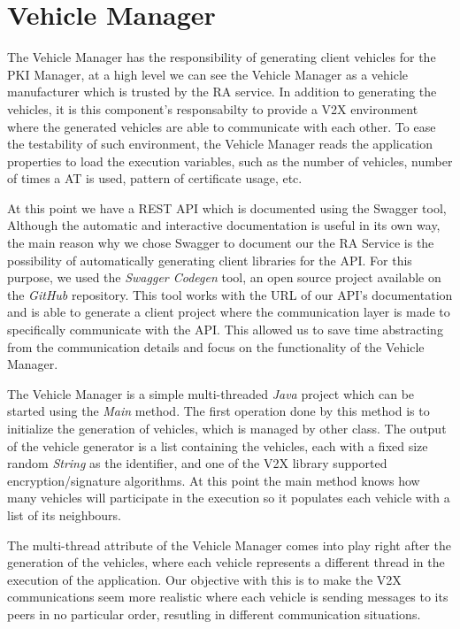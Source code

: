 \section{Vehicle Manager}
The Vehicle Manager has the responsibility of generating client vehicles for the PKI Manager, at a high level we can see the Vehicle Manager as a vehicle manufacturer which is trusted by the RA service. In addition to generating the vehicles, it is this component's responsabilty to provide a V2X environment where the generated vehicles are able to communicate with each other. To ease the testability of such environment, the Vehicle Manager reads the application properties to load the execution variables, such as the number of vehicles, number of times a AT is used, pattern of certificate usage, etc.

At this point we have a REST API which is documented using the Swagger tool, Although the automatic and interactive documentation is useful in its own way, the main reason why we chose Swagger to document our the RA Service is the possibility of automatically generating client libraries for the API. For this purpose, we used the \textit{Swagger Codegen} tool, an open source project available on the \textit{GitHub} repository. This tool works with the URL of our API's documentation and is able to generate a client project where the communication layer is made to specifically communicate with the API. This allowed us to save time abstracting from the communication details and focus on the functionality of the Vehicle Manager.

The Vehicle Manager is a simple multi-threaded \textit{Java} project which can be started using the \textit{Main} method. The first operation done by this method is to initialize the generation of vehicles, which is managed by other class. The output of the vehicle generator is a list containing the vehicles, each with a fixed size random \textit{String} as the identifier, and one of the V2X library supported encryption/signature algorithms. At this point the main method knows how many vehicles will participate in the execution so it populates each vehicle with a list of its neighbours. 

The multi-thread attribute of the Vehicle Manager comes into play right after the generation of the vehicles, where each vehicle represents a different thread in the execution of the application. Our objective with this is to make the V2X communications seem more realistic where each vehicle is sending messages to its peers in no particular order, resutling in different communication situations. 

